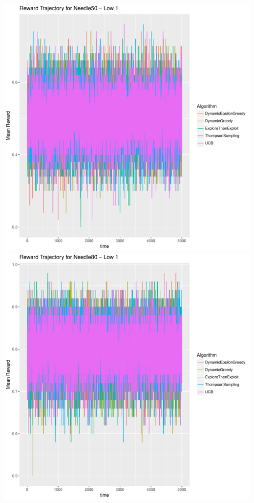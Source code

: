 \documentclass[11pt,letterpaper]{article}
\begin{document}
\includegraphics[scale=0.5]{"../results/Reward Trajectory for Needle50 - Low 1"} \\
\includegraphics[scale=0.5]{"../results/Reward Trajectory for Needle80 - Low 1"}
\\
\end{document}
